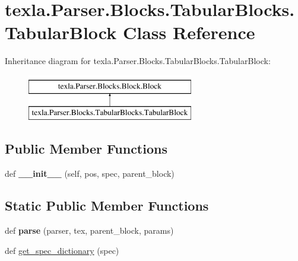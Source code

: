 \hypertarget{classtexla_1_1Parser_1_1Blocks_1_1TabularBlocks_1_1TabularBlock}{}\section{texla.\+Parser.\+Blocks.\+Tabular\+Blocks.\+Tabular\+Block Class Reference}
\label{classtexla_1_1Parser_1_1Blocks_1_1TabularBlocks_1_1TabularBlock}
Inheritance diagram for texla.\+Parser.\+Blocks.\+Tabular\+Blocks.\+Tabular\+Block\+:\begin{figure}[H]
\begin{center}
\leavevmode
\includegraphics[height=2.000000cm]{classtexla_1_1Parser_1_1Blocks_1_1TabularBlocks_1_1TabularBlock}
\end{center}
\end{figure}
\subsection*{Public Member Functions}
\begin{DoxyCompactItemize}
\item 
\hypertarget{classtexla_1_1Parser_1_1Blocks_1_1TabularBlocks_1_1TabularBlock_aabc52fe3898e0309fbc223265f27e816}{}\label{classtexla_1_1Parser_1_1Blocks_1_1TabularBlocks_1_1TabularBlock_aabc52fe3898e0309fbc223265f27e816} 
def {\bfseries \+\_\+\+\_\+init\+\_\+\+\_\+} (self, pos, spec, parent\+\_\+block)
\end{DoxyCompactItemize}
\subsection*{Static Public Member Functions}
\begin{DoxyCompactItemize}
\item 
\hypertarget{classtexla_1_1Parser_1_1Blocks_1_1TabularBlocks_1_1TabularBlock_ac4888029c6b1d87571d8e2bd9c9230cc}{}\label{classtexla_1_1Parser_1_1Blocks_1_1TabularBlocks_1_1TabularBlock_ac4888029c6b1d87571d8e2bd9c9230cc} 
def {\bfseries parse} (parser, tex, parent\+\_\+block, params)
\item 
def \hyperlink{classtexla_1_1Parser_1_1Blocks_1_1TabularBlocks_1_1TabularBlock_a44ef251d20c1365275ab9ffeda057f69}{get\+\_\+spec\+\_\+dictionary} (spec)
\end{DoxyCompactItemize}
